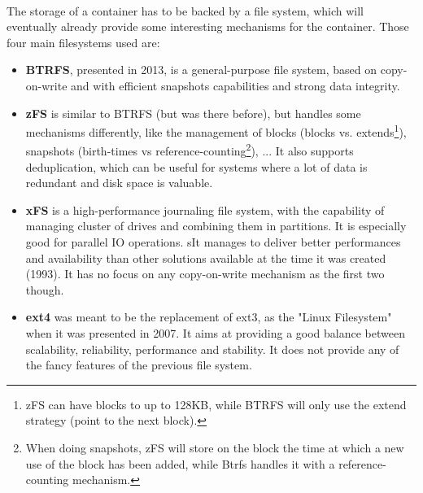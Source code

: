 \paragraph{}The storage of a container has to be backed by a file system, which will eventually already provide some interesting mechanisms for the container.  Those four main filesystems used are:
\begin{itemize}
\renewcommand\labelitemi{--}
  \item \textbf{BTRFS}, presented in 2013, \cite{rodeh2013btrfs} is a general-purpose file system, based on copy-on-write and with efficient snapshots capabilities and strong data integrity.
  \item \textbf{zFS} is similar to BTRFS (but was there before), but handles some mechanisms differently, like the management of blocks (blocks vs. extends\footnote{zFS can have blocks to up to 128KB, while BTRFS will only use the extend strategy (point to the next block).}), snapshots (birth-times vs reference-counting\footnote{When doing snapshots, zFS will store on the block the time at which a new use of the block has been added, while Btrfs handles it with a reference-counting mechanism.}), ...  It also supports deduplication, which can be useful for systems where a lot of data is redundant and disk space is valuable.
  \item \textbf{xFS} is a high-performance journaling file system, with the capability of managing cluster of drives and combining them in partitions.  It is especially good for parallel IO operations.  sIt manages to deliver better performances and availability than other solutions available at the time it was created (1993).\cite{wang1993xfs}  It has no focus on any copy-on-write mechanism as the first two though.
  \item \textbf{ext4} was meant to be the replacement of ext3, as the "Linux Filesystem" when it was presented in 2007. \cite{mathur2007new}  It aims at providing a good balance between scalability, reliability, performance and stability.  It does not provide any of the fancy features of the previous file system.
\end{itemize}

